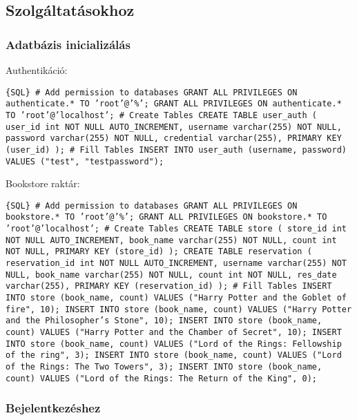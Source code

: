 \subsection{Szolgáltatásokhoz}\label{szolguxe1ltatuxe1sokhoz}

\subsubsection{Adatbázis
inicializálás}\label{adatbuxe1zis-inicializuxe1luxe1s}

Authentikáció:

\texttt{\{SQL\} \# Add permission to databases GRANT ALL PRIVILEGES ON authenticate.* TO 'root'@'\%'; GRANT ALL PRIVILEGES ON authenticate.* TO 'root'@'localhost'; \# Create Tables CREATE TABLE user\_auth (     user\_id int NOT NULL AUTO\_INCREMENT,     username varchar(255) NOT NULL,     password varchar(255) NOT NULL,     credential varchar(255),     PRIMARY KEY (user\_id) ); \# Fill Tables INSERT INTO user\_auth (username, password) VALUES ("test", "testpassword");}

Bookstore raktár:

\texttt{\{SQL\} \# Add permission to databases GRANT ALL PRIVILEGES ON bookstore.* TO 'root'@'\%'; GRANT ALL PRIVILEGES ON bookstore.* TO 'root'@'localhost'; \# Create Tables CREATE TABLE store (     store\_id int NOT NULL AUTO\_INCREMENT,     book\_name varchar(255) NOT NULL,     count int NOT NULL,     PRIMARY KEY (store\_id) ); CREATE TABLE reservation (     reservation\_id int NOT NULL AUTO\_INCREMENT,     username varchar(255) NOT NULL,     book\_name varchar(255) NOT NULL,     count int NOT NULL,     res\_date varchar(255),     PRIMARY KEY (reservation\_id) ); \# Fill Tables INSERT INTO store (book\_name, count) VALUES ("Harry Potter and the Goblet of fire", 10); INSERT INTO store (book\_name, count) VALUES ("Harry Potter and the Philosopher's Stone", 10); INSERT INTO store (book\_name, count) VALUES ("Harry Potter and the Chamber of Secret", 10); INSERT INTO store (book\_name, count) VALUES ("Lord of the Rings: Fellowship of the ring", 3); INSERT INTO store (book\_name, count) VALUES ("Lord of the Rings: The Two Towers", 3); INSERT INTO store (book\_name, count) VALUES ("Lord of the Rings: The Return of the King", 0);}

\subsubsection{Bejelentkezéshez}\label{bejelentkezuxe9shez}

